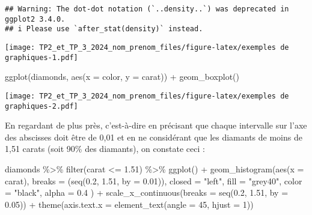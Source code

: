 \documentclass[
]{article}
\newenvironment{Shaded}{\begin{snugshade}}{\end{snugshade}}
\newcommand{\AttributeTok}[1]{\textcolor[rgb]{0.77,0.63,0.00}{#1}}
\newcommand{\DecValTok}[1]{\textcolor[rgb]{0.00,0.00,0.81}{#1}}
\newcommand{\FloatTok}[1]{\textcolor[rgb]{0.00,0.00,0.81}{#1}}
\newcommand{\FunctionTok}[1]{\textcolor[rgb]{0.00,0.00,0.00}{#1}}
\newcommand{\NormalTok}[1]{#1}
\newcommand{\SpecialCharTok}[1]{\textcolor[rgb]{0.00,0.00,0.00}{#1}}
\newcommand{\StringTok}[1]{\textcolor[rgb]{0.31,0.60,0.02}{#1}}
\begin{document}
\begin{verbatim}
## Warning: The dot-dot notation (`..density..`) was deprecated in ggplot2 3.4.0.
## i Please use `after_stat(density)` instead.
\end{verbatim}

\texttt{[image: TP2\_et\_TP\_3\_2024\_nom\_prenom\_files/figure-latex/exemples de graphiques-1.pdf]}

\begin{Shaded}
\begin{Highlighting}[]
\FunctionTok{ggplot}\NormalTok{(diamonds, }\FunctionTok{aes}\NormalTok{(}\AttributeTok{x =}\NormalTok{ color, }\AttributeTok{y =}\NormalTok{ carat)) }\SpecialCharTok{+}
  \FunctionTok{geom\_boxplot}\NormalTok{()}
\end{Highlighting}
\end{Shaded}

\texttt{[image: TP2\_et\_TP\_3\_2024\_nom\_prenom\_files/figure-latex/exemples de graphiques-2.pdf]}

En regardant de plus près, c'est-à-dire en précisant que chaque
intervalle sur l'axe des abscisses doit être de 0,01 et en ne
considérant que les diamants de moins de 1,51 carats (soit 90\% des
diamants), on constate ceci :

\begin{Shaded}
\begin{Highlighting}[]
\NormalTok{diamonds }\SpecialCharTok{\%\textgreater{}\%}
  \FunctionTok{filter}\NormalTok{(carat }\SpecialCharTok{\textless{}=} \FloatTok{1.51}\NormalTok{) }\SpecialCharTok{\%\textgreater{}\%}
  \FunctionTok{ggplot}\NormalTok{() }\SpecialCharTok{+}
  \FunctionTok{geom\_histogram}\NormalTok{(}\FunctionTok{aes}\NormalTok{(}\AttributeTok{x =}\NormalTok{ carat),}
    \AttributeTok{breaks =}\NormalTok{ (}\FunctionTok{seq}\NormalTok{(}\FloatTok{0.2}\NormalTok{, }\FloatTok{1.51}\NormalTok{, }\AttributeTok{by =} \FloatTok{0.01}\NormalTok{)),}
    \AttributeTok{closed =} \StringTok{"left"}\NormalTok{, }\AttributeTok{fill =} \StringTok{"grey40"}\NormalTok{, }\AttributeTok{color =} \StringTok{"black"}\NormalTok{, }\AttributeTok{alpha =} \FloatTok{0.4}
\NormalTok{  ) }\SpecialCharTok{+}
  \FunctionTok{scale\_x\_continuous}\NormalTok{(}\AttributeTok{breaks =} \FunctionTok{seq}\NormalTok{(}\FloatTok{0.2}\NormalTok{, }\FloatTok{1.51}\NormalTok{, }\AttributeTok{by =} \FloatTok{0.05}\NormalTok{)) }\SpecialCharTok{+}
  \FunctionTok{theme}\NormalTok{(}\AttributeTok{axis.text.x =} \FunctionTok{element\_text}\NormalTok{(}\AttributeTok{angle =} \DecValTok{45}\NormalTok{, }\AttributeTok{hjust =} \DecValTok{1}\NormalTok{))}
\end{Highlighting}
\end{Shaded}
\end{document}
